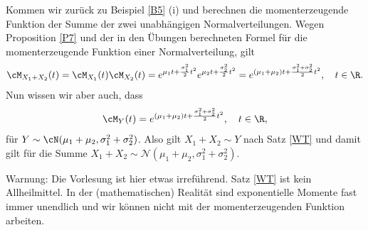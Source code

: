 \begin{beispiel}
	Kommen wir zur\"uck zu Beispiel \ref{B5} (i) und berechnen die momenterzeugende Funktion der Summe der zwei unabh\"angigen Normalverteilungen. Wegen Proposition \ref{P7} und der in den \"Ubungen berechneten Formel f\"ur die momenterzeugende Funktion einer Normalverteilung, gilt
	\begin{gather*}
		\cM_{X_1+X_2}(t) = \cM_{X_1}(t)\cM_{X_2}(t) = e^{\mu_1 t + \frac{\sigma_1^2}{2}t^2} e^{\mu_2 t + \frac{\sigma_2^2}{2}t^2}=e^{(\mu_1+\mu_2)t + \frac{\sigma_1^2 + \sigma_2^2}{2}t^2},\quad t\in\R.
	\end{gather*}
	Nun wissen wir aber auch, dass
	\begin{align*}
		\cM_Y(t)=e^{(\mu_1+\mu_2)t + \frac{\sigma_1^2 + \sigma_2^2}{2}t^2}, \quad t\in\R,
	\end{align*}
	 f\"ur $Y \sim \cN(\mu_1 + \mu_2, \sigma_1^2 + \sigma_2^2)$. Also gilt $X_1+X_2\sim Y$ nach Satz \ref{WT} und damit gilt f\"ur die Summe $X_1+X_2\sim \mathcal N(\mu_1+\mu_2,\sigma_1^2 + \sigma_2^2)$.
\end{beispiel}
Warnung: Die Vorlesung ist hier etwas irref\"uhrend. Satz \ref{WT} ist kein Allheilmittel. In der (mathematischen) Realit\"at sind exponentielle Momente fast immer unendlich und wir k\"onnen nicht mit der momenterzeugenden Funktion arbeiten. 



